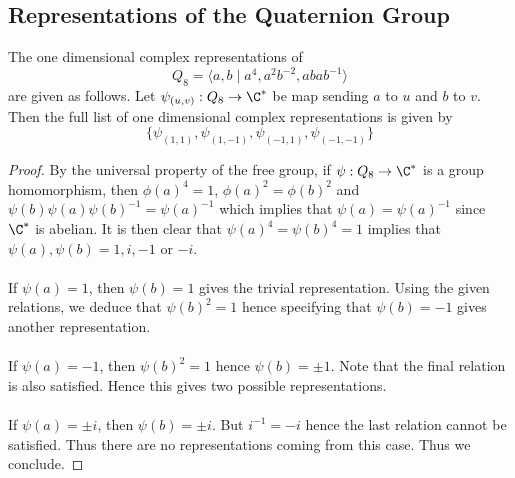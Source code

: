 \documentclass[a4paper]{article}
\begin{document}
\subsection{Representations of the Quaternion Group}
\begin{thm}{}{} The one dimensional complex representations of $$Q_8=\langle a,b\;|\;a^4,a^2b^{-2},abab^{-1}\rangle$$ are given as follows. Let $\psi_{(u,v)}:Q_8\to\C^\ast$ be map sending $a$ to $u$ and $b$ to $v$. Then the full list of one dimensional complex representations is given by $$\{\psi_{(1,1)},\psi_{(1,-1)},\psi_{(-1,1)},\psi_{(-1,-1)}\}$$ \tcbline
\begin{proof}
By the universal property of the free group, if $\psi:Q_8\to\C^\ast$ is a group homomorphism, then $\phi(a)^4=1$, $\phi(a)^2=\phi(b)^2$ and $\psi(b)\psi(a)\psi(b)^{-1}=\psi(a)^{-1}$ which implies that $\psi(a)=\psi(a)^{-1}$ since $\C^\ast$ is abelian. It is then clear that $\psi(a)^4=\psi(b)^4=1$ implies that $\psi(a),\psi(b)=1,i,-1$ or $-i$. \\~\\

If $\psi(a)=1$, then $\psi(b)=1$ gives the trivial representation. Using the given relations, we deduce that $\psi(b)^2=1$ hence specifying that $\psi(b)=-1$ gives another representation. \\~\\

If $\psi(a)=-1$, then $\psi(b)^2=1$ hence $\psi(b)=\pm1$. Note that the final relation is also satisfied. Hence this gives two possible representations. \\~\\

If $\psi(a)=\pm i$, then $\psi(b)=\pm i$. But $i^{-1}=-i$ hence the last relation cannot be satisfied. Thus there are no representations coming from this case. Thus we conclude. 
\end{proof}
\end{thm}
\end{document}
